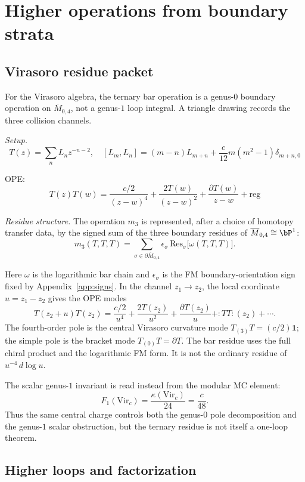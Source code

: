 \section{Higher operations from boundary strata}

\subsection{Virasoro residue packet}

\begin{example}\label{ex:virasoro-one-loop}
For the Virasoro algebra, the ternary bar operation is a genus-$0$
boundary operation on $\overline{M}_{0,4}$, not a genus-$1$ loop
integral.  A triangle drawing records the three collision channels.

\noindent\emph{Setup.}
\[T(z) = \sum_n L_n z^{-n-2}, \quad [L_m, L_n] = (m-n)L_{m+n} +
\frac{c}{12}m(m^2-1)\delta_{m+n,0}\]

OPE:
\[T(z)T(w) = \frac{c/2}{(z-w)^4} + \frac{2T(w)}{(z-w)^2} +
\frac{\partial T(w)}{z-w} + \text{reg}\]

\noindent\emph{Residue structure.}
The operation $m_3$ is represented, after a choice of homotopy transfer
data, by the signed sum of the three boundary residues of
$\overline{M}_{0,4} \cong \bP^1$:
\[m_3(T, T, T) = \sum_{\sigma \in \partial \overline{M}_{0,4}}
\epsilon_\sigma\,\mathrm{Res}_\sigma\bigl[\omega(T,T,T)\bigr].\]

Here $\omega$ is the logarithmic bar chain and
$\epsilon_\sigma$ is the FM boundary-orientation sign fixed by
Appendix~\ref{app:signs}.  In the channel $z_1\to z_2$, the local
coordinate $u=z_1-z_2$ gives the OPE modes
\[
T(z_2+u)T(z_2)
= \frac{c/2}{u^4}+\frac{2T(z_2)}{u^2}
 +\frac{\partial T(z_2)}{u}+{:}TT{:}(z_2)+\cdots .
\]
The fourth-order pole is the central Virasoro curvature mode
$T_{(3)}T=(c/2)\mathbf{1}$; the simple pole is the bracket mode
$T_{(0)}T=\partial T$.  The bar residue uses the full chiral product
and the logarithmic FM form.  It is not the ordinary residue of
$u^{-4}\,d\log u$.

The scalar genus-$1$ invariant is read instead from the modular MC
element:
\[
F_1(\mathrm{Vir}_c)=\frac{\kappa(\mathrm{Vir}_c)}{24}
=\frac{c}{48}.
\]
Thus the same central charge controls both the genus-$0$ pole
decomposition and the genus-$1$ scalar obstruction, but the ternary
residue is not itself a one-loop theorem.
\end{example}

\subsection{Higher loops and factorization}

